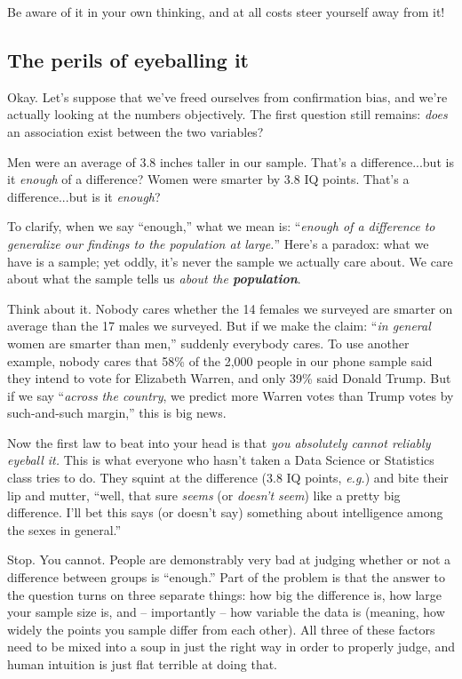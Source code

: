 Be aware of it in your own thinking, and at all costs steer yourself away from
it!

\subsection{The perils of eyeballing it}

Okay. Let's suppose that we've freed ourselves from confirmation bias, and
we're actually looking at the numbers objectively. The first question still
remains: \textit{does} an association exist between the two variables?

Men were an average of 3.8 inches taller in our sample. That's a
difference...but is it \textit{enough} of a difference? Women were smarter by
3.8 IQ points. That's a difference...but is it \textit{enough}?


To clarify, when we say ``enough,'' what we mean is: ``\textit{enough of a
difference to generalize our findings to the population at large.}'' Here's a
paradox: what we have is a sample; yet oddly, it's never the sample we actually
care about. We care about what the sample tells us \textit{about the
\textbf{population}}.


Think about it. Nobody cares whether the 14 females we surveyed are smarter on
average than the 17 males we surveyed. But if we make the claim: ``\textit{in
general} women are smarter than men,'' suddenly everybody cares. To use another
example, nobody cares that 58\% of the 2,000 people in our phone sample said
they intend to vote for Elizabeth Warren, and only 39\% said Donald Trump. But
if we say ``\textit{across the country}, we predict more Warren votes than
Trump votes by such-and-such margin,'' this is big news.


Now the first law to beat into your head is that \textit{you absolutely cannot
reliably eyeball it.} This is what everyone who hasn't taken a Data Science or
Statistics class tries to do. They squint at the difference (3.8 IQ points,
\textit{e.g.}) and bite their lip and mutter, ``well, that sure \textit{seems}
(or \textit{doesn't seem}) like a pretty big difference. I'll bet this says (or
doesn't say) something about intelligence among the sexes in general.''

Stop. You cannot. People are demonstrably very bad at judging whether or not a
difference between groups is ``enough.'' Part of the problem is that the answer
to the question turns on three separate things: how big the difference is, how
large your sample size is, and -- importantly -- how variable the data is
(meaning, how widely the points you sample differ from each other). All three
of these factors need to be mixed into a soup in just the right way in order to
properly judge, and human intuition is just flat terrible at doing that.

